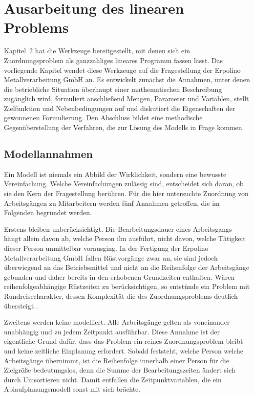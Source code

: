 \chapter{Ausarbeitung des linearen Problems}
\label{kap:modell}

Kapitel~2 hat die Werkzeuge bereitgestellt, mit denen sich ein
Zuordnungsproblem als ganzzahliges lineares Programm fassen lässt. Das
vorliegende Kapitel wendet diese Werkzeuge auf die Fragestellung der Erpolino
Metallverarbeitung GmbH an. Es entwickelt zunächst die Annahmen, unter denen die
betriebliche Situation überhaupt einer mathematischen Beschreibung zugänglich
wird, formuliert anschließend Mengen, Parameter und Variablen, stellt
Zielfunktion und Nebenbedingungen auf und diskutiert die Eigenschaften der
gewonnenen Formulierung. Den Abschluss bildet eine methodische Gegenüberstellung
der Verfahren, die zur Lösung des Modells in Frage kommen.

\section{Modellannahmen}
\label{sec:annahmen}

Ein Modell ist niemals ein Abbild der Wirklichkeit, sondern eine bewusste
Vereinfachung. Welche Vereinfachungen zulässig sind, entscheidet sich daran, ob
sie den Kern der Fragestellung berühren. Für die hier untersuchte Zuordnung von
Arbeitsgängen zu Mitarbeitern werden fünf Annahmen getroffen, die im Folgenden
begründet werden.

Erstens bleiben  unberücksichtigt. Die Bearbeitungsdauer eines
Arbeitsgangs hängt allein davon ab, welche Person ihn ausführt, nicht davon,
welche Tätigkeit dieser Person unmittelbar vorausging. In der Fertigung der
Erpolino Metallverarbeitung GmbH fallen Rüstvorgänge zwar an, sie sind jedoch
überwiegend an das Betriebsmittel und nicht an die Reihenfolge der Arbeitsgänge
gebunden und daher bereits in den erhobenen Grundzeiten enthalten. Wären
reihenfolgeabhängige Rüstzeiten zu berücksichtigen, so entstünde ein Problem mit
Rundreisecharakter, dessen Komplexität die des Zuordnungsproblems deutlich
übersteigt \parencite{pinedo2016scheduling}.

Zweitens werden keine  modelliert. Alle
Arbeitsgänge gelten als voneinander unabhängig und zu jedem Zeitpunkt ausführbar.
Diese Annahme ist der eigentliche Grund dafür, dass das Problem ein reines
Zuordnungsproblem bleibt und keine zeitliche Einplanung erfordert. Sobald
feststeht, welche Person welche Arbeitsgänge übernimmt, ist die Reihenfolge
innerhalb einer Person für die Zielgröße bedeutungslos, denn die Summe der
Bearbeitungszeiten ändert sich durch Umsortieren nicht. Damit entfallen die
Zeitpunktvariablen, die ein Ablaufplanungsmodell sonst mit sich brächte.

